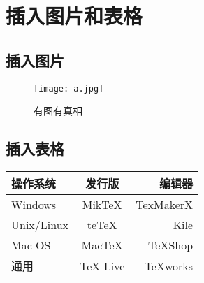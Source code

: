 \documentclass[12pt]{article}
\begin{document}
\section{插入图片和表格}
\subsection{插入图片}
\begin{figure}[htbp]
\centering
\texttt{[image: a.jpg]}
\caption{有图有真相}
\label{fig:myphoto}
\end{figure}

\subsection{插入表格}
\begin{tabular}{|l|c|r|}
 \hline
操作系统& 发行版& 编辑器\\
 \hline
Windows & MikTeX & TexMakerX \\
 \hline
Unix/Linux & teTeX & Kile \\
 \hline
Mac OS & MacTeX & TeXShop \\
 \hline
通用& TeX Live & TeXworks \\
 \hline
\end{tabular}
\end{document}
